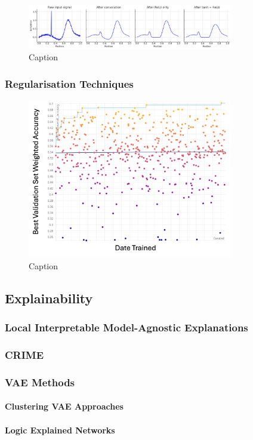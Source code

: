 \begin{figure}[htbp]
  \centering
  \includegraphics[width=0.8\textwidth]{Images/Tanh_Relu_Demo.png}
  \caption{Caption}
  \label{fig:my-label}
\end{figure}
\subsubsection{Regularisation Techniques}

\begin{figure}[htbp] 
    \centering 
    \includegraphics[width=0.8\textwidth]{Images/Ensemble_rough.png} 
    \caption{Caption} \label{fig:my-label}
\end{figure}

\subsection{Explainability}
\subsubsection{Local Interpretable Model-Agnostic Explanations}
\subsubsection{CRIME}
\subsubsection{VAE Methods}
\paragraph{Clustering VAE Approaches}
\paragraph{Logic Explained Networks}